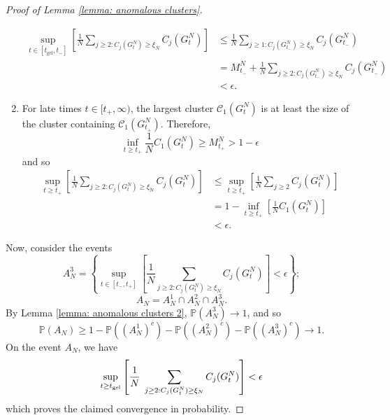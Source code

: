 \begin{proof}[Proof of Lemma \ref{lemma: anomalous clusters}]
\begin{enumerate}[label=\roman{*}).]
    \begin{equation} \begin{split}
        \sup_{t\in [t_\text{gel}, t_-]} \left[\frac{1}{N} \sum_{j\geq 2: C_j(G^N_t)\geq \xi_N} C_j(G^N_t)\right] & \leq \frac{1}{N}\sum_{j\geq 1: C_j(G^N_{t_-}) \geq \xi_N} C_j(G^N_{t_-}) \\ & = M^N_{t_-}+\frac{1}{N}\sum_{j\geq 2: C_j(G^N_{t_-}) \geq \xi_N} C_j(G^N_{t_-})\\ & <\epsilon.
   \end{split} \end{equation}
    \item For late times $t\in [t_+, \infty)$, the largest cluster $\mathcal{C}_1(G^N_t)$ is at least the size of the cluster containing $\mathcal{C}_1(G^N_{t_+})$. Therefore, \begin{equation}
        \inf_{t\geq t_+} \frac{1}{N}C_1(G^N_t)\geq M^N_{t_+}>1-\epsilon
    \end{equation} and so 
    \begin{equation}\begin{split}
        \sup_{t\geq t_+} \left[\frac{1}{N} \sum_{j\geq 2: C_j(G^N_t)\geq \xi_N} C_j(G^N_t)\right] & \leq \sup_{t\geq t_+} \left[ \frac{1}{N} \sum_{j\geq 2} C_j(G^N_t)\right] \\ & =1-\inf_{t\geq t_+} \left[\frac{1}{N}C_1(G^N_t)\right] \\ & <\epsilon. \end{split}
    \end{equation}
\end{enumerate}
Now, consider the events
\begin{equation}
    A^3_N=\left\{\sup_{t\in [t_-, t_+]}\left[\frac{1}{N}\sum_{j\geq 2: C_j(G^N_{t})\geq \xi_N} C_j(G^N_{t})\right]<\epsilon \right\};\end{equation}
    \begin{equation}
    A_N=A^1_N\cap A^2_N\cap A^3_N.\end{equation} By Lemma \ref{lemma: anomalous clusters 2}, $\mathbb{P}(A^3_N)\rightarrow 1$, and so \begin{equation}
        \mathbb{P}(A_N)\geq 1-\mathbb{P}((A^1_N)^c)-\mathbb{P}((A^2_N)^c)-\mathbb{P}((A^3_N)^c) \rightarrow 1.
    \end{equation} On the event $A_N$, we have \begin{equation}
        \sup_{t\geq t_\text{gel}}\left[\frac{1}{N}\hspace{0.1cm} \sum_{j\geq 2: C_j(G^N_t)\geq \xi_N} C_j(G^N_t)\right] <\epsilon
    \end{equation} which proves the claimed convergence in probability. 
\end{proof} 
